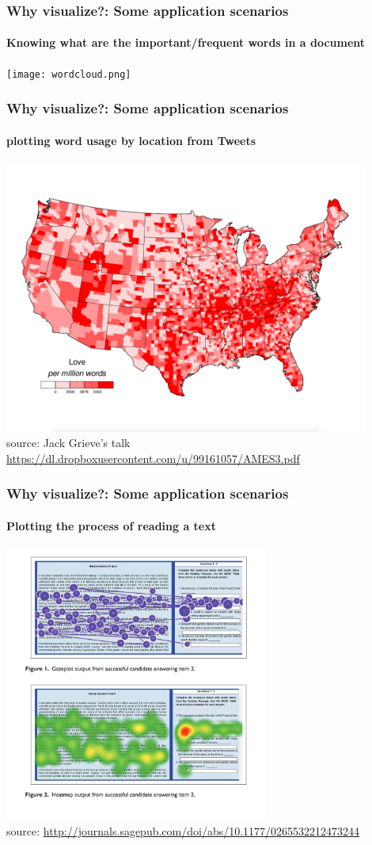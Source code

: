 \documentclass{beamer}
\begin{document}
\begin{frame}
\frametitle{Why visualize?: Some application scenarios}
\framesubtitle{Knowing what are the important/frequent words in a document}
\texttt{[image: wordcloud.png]} \\
\end{frame}

\begin{frame}
\frametitle{Why visualize?: Some application scenarios}
\framesubtitle{plotting word usage by location from Tweets}
\includegraphics[width=0.9\textwidth]{geotaggedtweet.png} \\
\footnotesize source: Jack Grieve's talk \url{https://dl.dropboxusercontent.com/u/99161057/AMES3.pdf} 
\end{frame}

\begin{frame}
\frametitle{Why visualize?: Some application scenarios}
\framesubtitle{Plotting the process of reading a text}
\includegraphics[width=0.65\textwidth]{textgazeplot.png} \\
\scriptsize source: \url{http://journals.sagepub.com/doi/abs/10.1177/0265532212473244} 
\end{frame}
\end{document}
